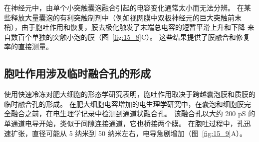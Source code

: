 在神经元中，由单个小突触囊泡融合引起的电容变化通常太小而无法分辨。
在某些释放大量囊泡的有利突触制剂中（例如视网膜中双极神经元的巨大突触前末梢），由于胞吐作用和恢复，膜去极化触发了末端总电容的短暂平滑上升和下降 来自数百个单独的突触小泡的膜（图~\ref{fig:15_8}C）。 
这些结果提供了膜融合和修复率的直接测量。



\subsection{胞吐作用涉及临时融合孔的形成}

使用快速冷冻对肥大细胞的形态学研究表明，胞吐作用取决于跨越囊泡膜和质膜的临时融合孔的形成。
在肥大细胞电容增加的电生理学研究中，在囊泡和细胞膜完全融合之前，在电生理学记录中检测到通道状融合孔。 
该融合孔以大约 200 pS 的单通道电导开始，类似于间隙连接通道，它也桥接两个膜。
在胞吐过程中，孔迅速扩张，直径可能从 5 纳米到 50 纳米左右，电导急剧增加（图~\ref{fig:15_9}A）。


